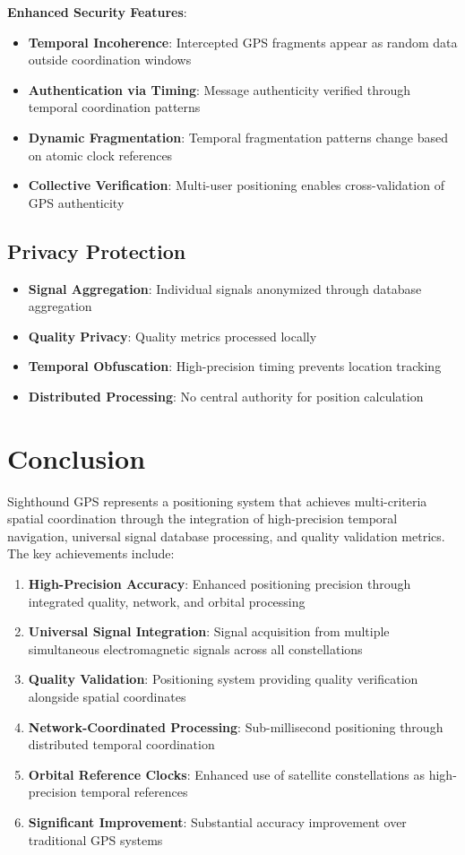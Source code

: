 \documentclass[12pt,a4paper]{article}
\begin{document}
\textbf{Enhanced Security Features}:
\begin{itemize}
\item \textbf{Temporal Incoherence}: Intercepted GPS fragments appear as random data outside coordination windows
\item \textbf{Authentication via Timing}: Message authenticity verified through temporal coordination patterns
\item \textbf{Dynamic Fragmentation}: Temporal fragmentation patterns change based on atomic clock references
\item \textbf{Collective Verification}: Multi-user positioning enables cross-validation of GPS authenticity
\end{itemize}

\subsection{Privacy Protection}

\begin{itemize}
\item \textbf{Signal Aggregation}: Individual signals anonymized through database aggregation
\item \textbf{Quality Privacy}: Quality metrics processed locally
\item \textbf{Temporal Obfuscation}: High-precision timing prevents location tracking
\item \textbf{Distributed Processing}: No central authority for position calculation
\end{itemize}

\section{Conclusion}

Sighthound GPS represents a positioning system that achieves multi-criteria spatial coordination through the integration of high-precision temporal navigation, universal signal database processing, and quality validation metrics. The key achievements include:

\begin{enumerate}
\item \textbf{High-Precision Accuracy}: Enhanced positioning precision through integrated quality, network, and orbital processing
\item \textbf{Universal Signal Integration}: Signal acquisition from multiple simultaneous electromagnetic signals across all constellations
\item \textbf{Quality Validation}: Positioning system providing quality verification alongside spatial coordinates
\item \textbf{Network-Coordinated Processing}: Sub-millisecond positioning through distributed temporal coordination
\item \textbf{Orbital Reference Clocks}: Enhanced use of satellite constellations as high-precision temporal references
\item \textbf{Significant Improvement}: Substantial accuracy improvement over traditional GPS systems
\end{enumerate}
\end{document}
